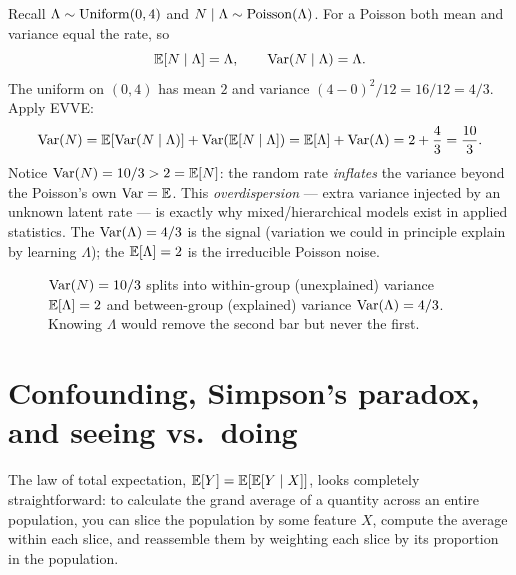 \begin{example}
\label{ch15:ex-poisson-var}
Recall $\Lambda \sim \operatorname{Uniform}(0,4)$ and $N \mid \Lambda \sim \operatorname{Poisson}(\Lambda)$. For a Poisson both mean and
variance equal the rate, so
\[
  \operatorname{\mathbb{E}}[N\mid\Lambda] = \Lambda, \qquad \operatorname{Var}(N\mid\Lambda) = \Lambda.
\]
The uniform on $(0,4)$ has mean $2$ and variance $(4-0)^2/12 = 16/12 = 4/3$. Apply EVVE:
\[
  \operatorname{Var}(N) = \operatorname{\mathbb{E}}[\operatorname{Var}(N\mid\Lambda)] + \operatorname{Var}(\operatorname{\mathbb{E}}[N\mid\Lambda])
          = \operatorname{\mathbb{E}}[\Lambda] + \operatorname{Var}(\Lambda) = 2 + \frac{4}{3} = \frac{10}{3}.
\]
Notice $\operatorname{Var}(N) = 10/3 > 2 = \operatorname{\mathbb{E}}[N]$: the random rate \emph{inflates} the variance beyond the
Poisson's own $\operatorname{Var} = \operatorname{\mathbb{E}}$. This \emph{overdispersion} --- extra variance injected by an unknown latent
rate --- is exactly why mixed/hierarchical models exist in applied statistics. The $\operatorname{Var}(\Lambda) = 4/3$
is the signal (variation we could in principle explain by learning $\Lambda$); the $\operatorname{\mathbb{E}}[\Lambda] = 2$ is
the irreducible Poisson noise.
\end{example}

\begin{figure}[H]
\centering
{}
\caption{$\operatorname{Var}(N) = 10/3$ splits into within-group (unexplained) variance $\operatorname{\mathbb{E}}[\Lambda] = 2$ and
between-group (explained) variance $\operatorname{Var}(\Lambda) = 4/3$. Knowing $\Lambda$ would remove the second bar
but never the first.}
\label{ch15:fig-eve}
\end{figure}

\section{Confounding, Simpson's paradox, and seeing vs.~doing}
\label{ch15:simpsons-causal}

The law of total expectation, $\operatorname{\mathbb{E}}[Y] = \operatorname{\mathbb{E}}[\operatorname{\mathbb{E}}[Y \mid X]]$, looks completely straightforward: to calculate the grand average of a quantity across an entire population, you can slice the population by some feature $X$, compute the average within each slice, and reassemble them by weighting each slice by its proportion in the population.

